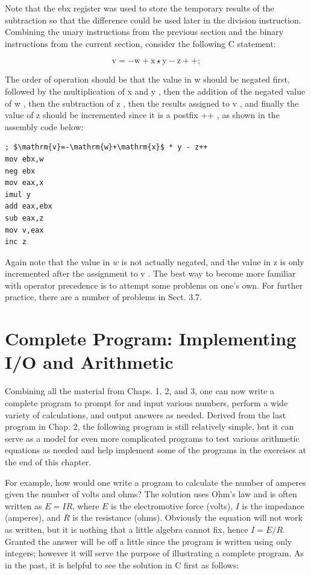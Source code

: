 \documentclass[10pt]{book}
\begin{document}
Note that the ebx register was used to store the temporary results of the subtraction so that the difference could be used later in the division instruction. Combining the unary instructions from the previous section and the binary instructions from the current section, consider the following C statement:

$$
\mathrm{v}=-\mathrm{w}+\mathrm{x} \star \mathrm{y}-\mathrm{z}++;
$$

The order of operation should be that the value in w should be negated first, followed by the multiplication of x and y , then the addition of the negated value of w , then the subtraction of z , then the results assigned to v , and finally the value of z should be incremented since it is a postfix ++ , as shown in the assembly code below:

\begin{verbatim}
; $\mathrm{v}=-\mathrm{w}+\mathrm{x}$ * y - z++
mov ebx,w
neg ebx
mov eax,x
imul y
add eax,ebx
sub eax,z
mov v,eax
inc z
\end{verbatim}

Again note that the value in $w$ is not actually negated, and the value in z is only incremented after the assignment to v . The best way to become more familiar with operator precedence is to attempt some problems on one's own. For further practice, there are a number of problems in Sect. 3.7.

\section{Complete Program: Implementing I/O and Arithmetic}
Combining all the material from Chaps. 1, 2, and 3, one can now write a complete program to prompt for and input various numbers, perform a wide variety of calculations, and output answers as needed. Derived from the last program in Chap. 2, the following program is still relatively simple, but it can serve as a model for even more complicated programs to test various arithmetic equations as needed and help implement some of the programs in the exercises at the end of this chapter.

For example, how would one write a program to calculate the number of amperes given the number of volts and ohms? The solution uses Ohm's law and is often written as $E=I R$, where $E$ is the electromotive force (volts), $I$ is the impedance (amperes), and $R$ is the resistance (ohms). Obviously the equation will not work as written, but it is nothing that a little algebra cannot fix, hence $I=E / R$. Granted the answer will be off a little since the program is written using only integers; however it will serve the purpose of illustrating a complete program. As in the past, it is helpful to see the solution in C first as follows:
\end{document}
